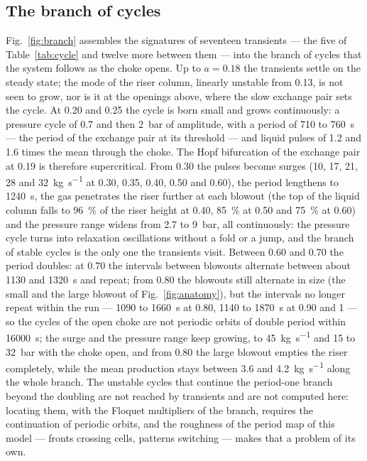 \documentclass[a4paper,fleqn]{cas-sc}
\begin{document}
\begin{table}[htbp]
\caption{Steady states of the base point against the choke opening: slow pair, pressures, pressure drop across the choke and production.}\label{tab:linear}
\footnotesize


\end{table}

\subsection{The branch of cycles}\label{sec:branch}

Fig.~\ref{fig:branch} assembles the signatures of seventeen transients --- the five of Table~\ref{tab:cycle} and twelve more between them --- into the branch of cycles that the system follows as the choke opens. Up to $a = 0.18$ the transients settle on the steady state; the mode of the riser column, linearly unstable from 0.13, is not seen to grow, nor is it at the openings above, where the slow exchange pair sets the cycle. At 0.20 and 0.25 the cycle is born small and grows continuously: a pressure cycle of 0.7 and then \SI{2}{\bar} of amplitude, with a period of 710 to \SI{760}{\second} --- the period of the exchange pair at its threshold --- and liquid pulses of 1.2 and 1.6 times the mean through the choke. The Hopf bifurcation of the exchange pair at 0.19 is therefore supercritical. From 0.30 the pulses become surges (10, 17, 21, 28 and \SI{32}{\kilogram\per\second} at 0.30, 0.35, 0.40, 0.50 and 0.60), the period lengthens to \SI{1240}{\second}, the gas penetrates the riser further at each blowout (the top of the liquid column falls to \SI{96}{\percent} of the riser height at 0.40, \SI{85}{\percent} at 0.50 and \SI{75}{\percent} at 0.60) and the pressure range widens from 2.7 to \SI{9}{\bar}, all continuously: the pressure cycle turns into relaxation oscillations without a fold or a jump, and the branch of stable cycles is the only one the transients visit. Between 0.60 and 0.70 the period doubles: at 0.70 the intervals between blowouts alternate between about 1130 and \SI{1320}{\second} and repeat; from 0.80 the blowouts still alternate in size (the small and the large blowout of Fig.~\ref{fig:anatomy}), but the intervals no longer repeat within the run --- 1090 to \SI{1660}{\second} at 0.80, 1140 to \SI{1870}{\second} at 0.90 and 1 --- so the cycles of the open choke are not periodic orbits of double period within \SI{16000}{\second}; the surge and the pressure range keep growing, to \SI{45}{\kilogram\per\second} and 15 to \SI{32}{\bar} with the choke open, and from 0.80 the large blowout empties the riser completely, while the mean production stays between 3.6 and \SI{4.2}{\kilogram\per\second} along the whole branch. The unstable cycles that continue the period-one branch beyond the doubling are not reached by transients and are not computed here: locating them, with the Floquet multipliers of the branch, requires the continuation of periodic orbits, and the roughness of the period map of this model --- fronts crossing cells, patterns switching --- makes that a problem of its own.
\end{document}
